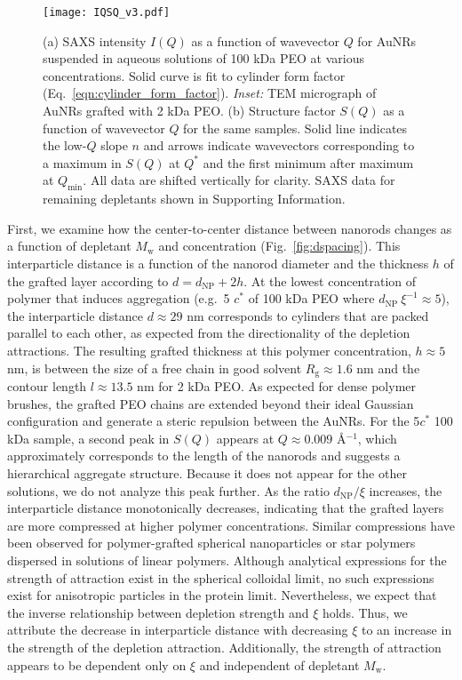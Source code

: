 \documentclass[journal=jacsat, superscriptaddress]{achemso}
\def\EDITS#1{{\color{black}#1}}
\def\EDITS#1{#1}
\begin{document}
\begin{figure}[ht!]
\texttt{[image: IQSQ\_v3.pdf]}
\caption{\label{fig:IQSQ} (a) SAXS intensity $I(Q)$ as a function of wavevector $Q$ for AuNRs suspended in aqueous solutions of 100 kDa PEO at various concentrations. Solid curve is fit to cylinder form factor (Eq.\ \ref{eqn:cylinder_form_factor}). \textit{Inset:} TEM micrograph of AuNRs \EDITS{grafted with 2 kDa PEO}. (b) Structure factor $S(Q)$ as a function of wavevector $Q$ for the same samples. Solid line indicates the low-$Q$ slope $n$ and arrows indicate wavevectors corresponding to a maximum in $S(Q)$ at $Q^*$ and the first minimum after maximum at $Q_\mathrm{min}$. All data are shifted vertically for clarity. \EDITS{SAXS data for remaining depletants shown in Supporting Information.}}
\end{figure}

First, we examine how the center-to-center distance between nanorods changes as a function of depletant $M_\mathrm{w}$ and concentration (Fig.\ \ref{fig:dspacing}). This interparticle distance is a function of the nanorod diameter and the thickness $h$ of the grafted layer according to $d = d_\mathrm{NP} + 2h$. At the lowest concentration of polymer that induces aggregation (e.g.\ 5 $c^*$ of 100 kDa PEO where $d_\mathrm{NP}\: \xi^{-1} \approx 5$), the interparticle distance $d \approx 29$ nm corresponds to cylinders that are packed parallel to each other, as expected from the directionality of the depletion attractions. The resulting grafted thickness at this polymer concentration, $h \approx 5$ nm, is between the size of a free chain in good solvent $R_\mathrm{g} \approx 1.6$ nm and the contour length $l \approx 13.5$ nm for 2 kDa PEO. As expected for dense polymer brushes, the grafted PEO chains are extended beyond their ideal Gaussian configuration and generate a steric repulsion between the AuNRs. For the 5$c^*$ 100 kDa sample, a second peak in $S(Q)$ appears at $Q \approx 0.009$ \AA$^{-1}$, which approximately corresponds to the length of the nanorods and suggests a hierarchical aggregate structure. Because it does not appear for the other solutions, we do not analyze this peak further. As the ratio $d_\mathrm{NP}/\xi$ increases, the interparticle distance monotonically decreases, indicating that the grafted layers are more compressed at higher polymer concentrations. Similar compressions have been observed for polymer-grafted spherical nanoparticles\cite{Poling-Skutvik2017} or star polymers\cite{Stiakakis2002,Wilk2010} dispersed in solutions of linear polymers. Although analytical expressions for the strength of attraction exist in the spherical colloidal limit,\cite{Lekkerkerker2011} no such expressions exist for anisotropic particles in the protein limit. Nevertheless, we expect that the inverse relationship between depletion strength and $\xi$ holds. Thus, we attribute the decrease in interparticle distance with decreasing $\xi$ to an increase in the strength of the depletion attraction. Additionally, the strength of attraction appears to be dependent only on $\xi$ and independent of depletant $M_\mathrm{w}$. 
\end{document}
